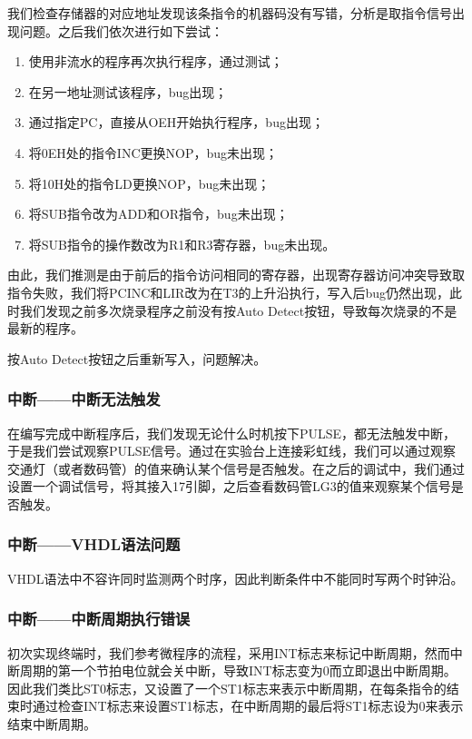 \documentclass[lang=cn,11pt,a4paper,cite=authornum]{paper}
\begin{document}
我们检查存储器的对应地址发现该条指令的机器码没有写错，分析是取指令信号出现问题。之后我们依次进行如下尝试：

\begin{enumerate}
    \item 使用非流水的程序再次执行程序，通过测试；
    \item 在另一地址测试该程序，bug出现；
    \item 通过指定PC，直接从OEH开始执行程序，bug出现；
    \item 将0EH处的指令INC更换NOP，bug未出现；
    \item 将10H处的指令LD更换NOP，bug未出现；
    \item 将SUB指令改为ADD和OR指令，bug未出现；
    \item 将SUB指令的操作数改为R1和R3寄存器，bug未出现。
\end{enumerate}

由此，我们推测是由于前后的指令访问相同的寄存器，出现寄存器访问冲突导致取指令失败，我们将PCINC和LIR改为在T3的上升沿执行，写入后bug仍然出现，此时我们发现之前多次烧录程序之前没有按Auto Detect按钮，导致每次烧录的不是最新的程序。

按Auto Detect按钮之后重新写入，问题解决。

\subsubsection{中断——中断无法触发}

在编写完成中断程序后，我们发现无论什么时机按下PULSE，都无法触发中断，于是我们尝试观察PULSE信号。通过在实验台上连接彩虹线，我们可以通过观察交通灯（或者数码管）的值来确认某个信号是否触发。在之后的调试中，我们通过设置一个调试信号，将其接入17引脚，之后查看数码管LG3的值来观察某个信号是否触发。

\subsubsection{中断——VHDL语法问题}

VHDL语法中不容许同时监测两个时序，因此判断条件中不能同时写两个时钟沿。

\subsubsection{中断——中断周期执行错误}

初次实现终端时，我们参考微程序的流程，采用INT标志来标记中断周期，然而中断周期的第一个节拍电位就会关中断，导致INT标志变为0而立即退出中断周期。因此我们类比ST0标志，又设置了一个ST1标志来表示中断周期，在每条指令的结束时通过检查INT标志来设置ST1标志，在中断周期的最后将ST1标志设为0来表示结束中断周期。
\end{document}
